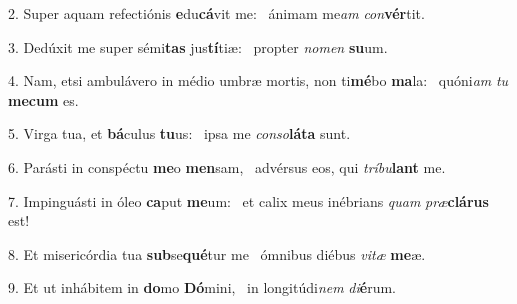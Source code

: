 2. Super aquam refectiónis \textbf{e}du\textbf{cá}vit me: \ast\  ánimam me\textit{am} \textit{con}\textbf{vér}tit.\

3. Dedúxit me super sémi\textbf{tas} jus\textbf{tí}tiæ: \ast\  propter \textit{no}\textit{men} \textbf{su}um.\

4. Nam, etsi ambulávero in médio umbræ mortis, non ti\textbf{mé}bo \textbf{ma}la: \ast\  quóni\textit{am} \textit{tu} \textbf{me}\textbf{cum} es.\

5. Virga tua, et \textbf{bá}culus \textbf{tu}us: \ast\  ipsa me \textit{con}\textit{so}\textbf{lá}\textbf{ta} sunt.\

6. Parásti in conspéctu \textbf{me}o \textbf{men}sam, \ast\  advérsus eos, qui \textit{trí}\textit{bu}\textbf{lant} me.\

7. Impinguásti in óleo \textbf{ca}put \textbf{me}um: \ast\  et calix meus inébrians \textit{quam} \textit{præ}\textbf{clá}\textbf{rus} est!\

8. Et misericórdia tua \textbf{sub}se\textbf{qué}tur me \ast\  ómnibus diébus \textit{vi}\textit{tæ} \textbf{me}æ.\

9. Et ut inhábitem in \textbf{do}mo \textbf{Dó}mini, \ast\  in longitúdi\textit{nem} \textit{di}\textbf{é}rum.\

